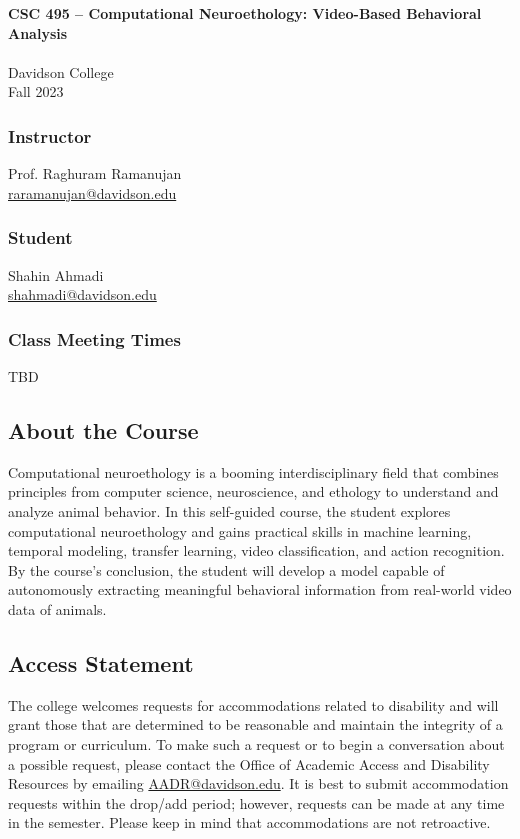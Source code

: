\documentclass[12pt]{article}
\begin{document}
\renewcommand*\arraystretch{1.5}

\begin{center}
  {\Large \textbf{CSC 495 -- Computational Neuroethology: Video-Based Behavioral Analysis}} \\
  ~\\
  Davidson College \\
  Fall 2023 \\
\end{center}

\subsubsection*{Instructor}
Prof. Raghuram Ramanujan \\
\url{raramanujan@davidson.edu}

\subsubsection*{Student}
Shahin Ahmadi \\
\url{shahmadi@davidson.edu}

\subsubsection*{Class Meeting Times}
TBD

\subsection*{About the Course}
Computational neuroethology is a booming interdisciplinary field that combines principles from computer science, neuroscience, and ethology to understand and analyze animal behavior. In this self-guided course, the student explores computational neuroethology and gains practical skills in machine learning, temporal modeling, transfer learning, video classification, and action recognition. By the course's conclusion, the student will develop a model capable of autonomously extracting meaningful behavioral information from real-world video data of animals.

\subsection*{Access Statement}

The college welcomes requests for accommodations related to disability and will grant those that are determined to be reasonable and maintain the integrity of a program or curriculum. To make such a request or to begin a conversation about a possible request, please contact the Office of Academic Access and Disability Resources by emailing \url{AADR@davidson.edu}.   It is best to submit accommodation requests within the drop/add period; however, requests can be made at any time in the semester.  Please keep in mind that accommodations are not retroactive.
\end{document}
